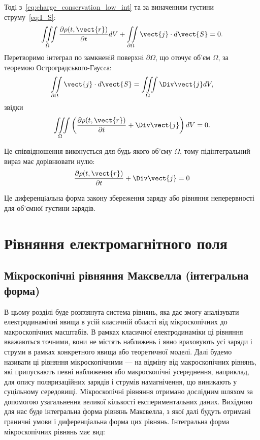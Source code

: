 Тодi з~\eqref{eq:charge_conservation_low_int}  та за виначенням густини струму~\eqref{eq:I_S}:
\begin{equation*}
	\iiint\limits_{\Omega} \frac{\partial\rho(t, \vect{r})}{\partial
		t} dV + \iint\limits_{\partial\Omega} \vect{j}\cdot d\vect{S} = 0.
\end{equation*}
Перетворимо iнтеграл по замкненiй поверхнi $\partial\Omega$, що оточує об'єм $\Omega$, за
теоремою Остроградського-Гаусcа:
\begin{equation*}
	\iint\limits_{\partial\Omega} \vect{j}\cdot d\vect{S} = \iiint\limits_{\Omega}\Div\vect{j} dV,
\end{equation*}
звідки
\begin{equation*}
	\iiint\limits_{\Omega} \left(\frac{\partial\rho(t, \vect{r})}{\partial
		t}  +  \Div\vect{j} \right) dV =0.
\end{equation*}

Це співвідношення виконується для будь-якого об'єму $\Omega$, тому
підінтегральний вираз має дорівнювати нулю:
\begin{equation}\label{eq:charge_conservation_low_diff}
	\frac{\partial\rho(t, \vect{r})}{\partial t}  +  \Div\vect{j}  = 0
\end{equation}

Це диференцiальна форма закону збереження заряду або рівняння неперервності для об’ємної густини зарядів.


\section{Рівняння електромагнітного поля}


\subsection*{Мікроскопічні рівняння Максвелла (інтегральна форма)}


В цьому розділі буде розглянута система рівнянь, яка дає змогу аналізувати електродинамічні явища в усій класичній області від мікроскопічних до
макроскопічних масштабів. В рамках класичної електродинаміки ці рівняння вважаються точними, вони не містять наближень і явно враховують усі заряди і
струми в рамках конкретного явища або теоретичної моделі. Далі будемо називати ці рівняння мікроскопічними --- на відміну від макроскопічних рівнянь,
які
припускають певні наближення або макроскопічні усереднення, наприклад, для опису поляризаційних зарядів і струмів намагнічення, що виникають у
суцільному середовищі. Мікроскопічні рівняння отримано дослідним шляхом за допомогою узагальнення великої кількості експериментальних даних. Вихідною
для нас буде інтегральна форма рівнянь Максвелла, з якої далі будуть отримані граничні умови і диференціальна форма цих рівнянь. Інтегральна форма
мікроскопічних рівнянь має вид:

